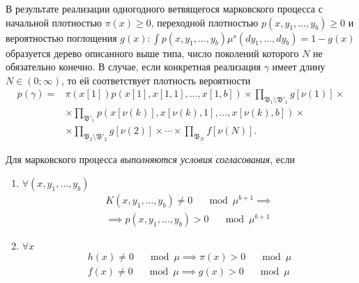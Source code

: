 В результате реализации одногодного ветвящегося марковского процесса с начальной плотностью $\pi\left(x\right) \geq 0$, переходной плотностью $p(x,y_1,\ldots,y_b) \geq 0$ и вероятностью поглощения $g\left(x\right): \int p(x,y_1,\ldots,y_b) \mu^s\left(dy_1, \ldots, dy_b\right) = 1 - g(x)$ образуется дерево описанного выше типа, число поколений которого $N$ не обязательно конечно. В случае, если конкретная реализация $\gamma$ имеет длину $N\in(0;\infty)$, то ей соответствует плотность вероятности
\begin{align*}
	p(\gamma) = &\pi\left(x\left[1\right]\right)p\left(x\left[1\right], x\left[1,1\right], \ldots ,x\left[1,b\right]\right)\times \prod_{\mathfrak{B}_1\setminus\mathfrak{B}'_1}g\left[\nu(1)\right] \times \\
	&\times \prod_{\mathfrak{B}'_1}p\left(x\left[\nu(k)\right], x\left[\nu(k),1\right], \ldots ,x\left[\nu(k),b\right]\right) \times \\
	&\times \prod_{\mathfrak{B}_2\setminus\mathfrak{B}'_2}g\left[\nu(2)\right]\times \cdots \times\prod_{\mathfrak{B}_N}f\left[\nu(N)\right].
\end{align*}

Для марковского процесса \emph{выполняются условия согласования}, если
\begin{enumerate}
 \item $\forall (x,y_1, \ldots, y_b)$ 
$$
\begin{aligned}
K\left(x, y_1, \ldots, y_b\right) \neq 0 \quad \mod \mu^{b+1} \implies \\ \implies p\left(x, y_1, \ldots, y_b\right) > 0 \quad \mod \mu^{b+1}
\end{aligned}$$
\item $\forall x$ $$
\begin{aligned}
h(x) \neq 0\quad \mod \mu \implies \pi(x) > 0\quad \mod \mu \\
f(x) \neq 0\quad \mod \mu \implies g(x) > 0\quad \mod \mu 
\end{aligned}$$
\end{enumerate}

